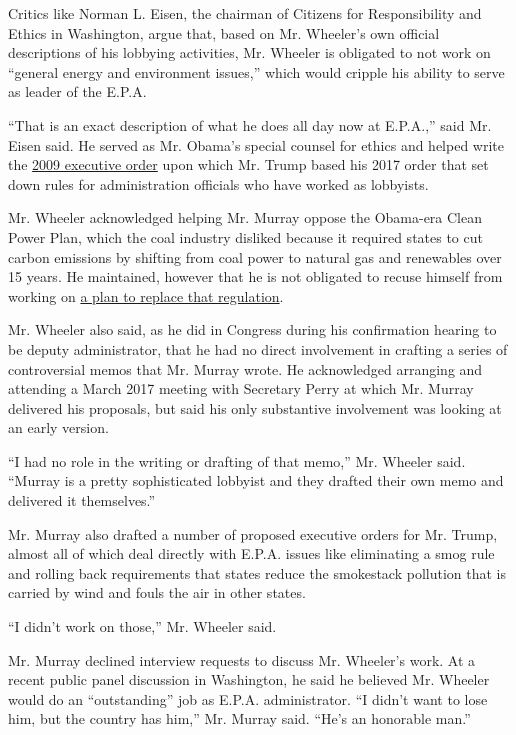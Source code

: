 Critics like Norman L. Eisen, the chairman of Citizens for
Responsibility and Ethics in Washington, argue that, based on Mr.
Wheeler's own official descriptions of his lobbying activities, Mr.
Wheeler is obligated to not work on ``general energy and environment
issues,'' which would cripple his ability to serve as leader of the
E.P.A.

``That is an exact description of what he does all day now at E.P.A.,''
said Mr. Eisen said. He served as Mr. Obama's special counsel for ethics
and helped write the
\href{https://oge.gov/Web/OGE.nsf/Executive\%20Orders/A70F962587DAC28F85257E96006A90F2/$FILE/23a5e4eeaffd4e14b4387b40b0eae5963.pdf?open}{2009
executive order} upon which Mr. Trump based his 2017 order that set down
rules for administration officials who have worked as lobbyists.

Mr. Wheeler acknowledged helping Mr. Murray oppose the Obama-era Clean
Power Plan, which the coal industry disliked because it required states
to cut carbon emissions by shifting from coal power to natural gas and
renewables over 15 years. He maintained, however that he is not
obligated to recuse himself from working on
\href{https://www.nytimes.com/2018/07/05/climate/clean-power-plan-replacement.html}{a
plan to replace that regulation}.

Mr. Wheeler also said, as he did in Congress during his confirmation
hearing to be deputy administrator, that he had no direct involvement in
crafting a series of controversial memos that Mr. Murray wrote. He
acknowledged arranging and attending a March 2017 meeting with Secretary
Perry at which Mr. Murray delivered his proposals, but said his only
substantive involvement was looking at an early version.

``I had no role in the writing or drafting of that memo,'' Mr. Wheeler
said. ``Murray is a pretty sophisticated lobbyist and they drafted their
own memo and delivered it themselves.''

Mr. Murray also drafted a number of proposed executive orders for Mr.
Trump, almost all of which deal directly with E.P.A. issues like
eliminating a smog rule and rolling back requirements that states reduce
the smokestack pollution that is carried by wind and fouls the air in
other states.

``I didn't work on those,'' Mr. Wheeler said.

Mr. Murray declined interview requests to discuss Mr. Wheeler's work. At
a recent public panel discussion in Washington, he said he believed Mr.
Wheeler would do an ``outstanding'' job as E.P.A. administrator. ``I
didn't want to lose him, but the country has him,'' Mr. Murray said.
``He's an honorable man.''

